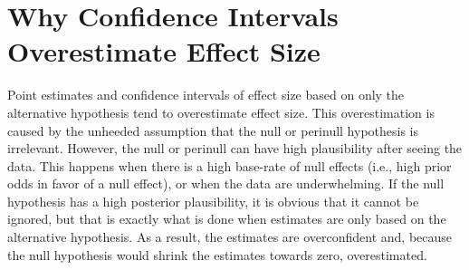 \documentclass[a4paper]{article}
\begin{document}
\section*{Why Confidence Intervals Overestimate Effect Size}
Point estimates and confidence intervals of effect size based on only the alternative hypothesis tend to overestimate effect size. This overestimation is caused by the unheeded assumption that the null or perinull hypothesis is irrelevant. However, the null or perinull can have high plausibility after seeing the data. This happens when there is a high base-rate of null effects (i.e., high prior odds in favor of a null effect), or when the data are underwhelming. If the null hypothesis has a high posterior plausibility, it is obvious that it cannot be ignored, but that is exactly what is done when estimates are only based on the alternative hypothesis. As a result, the estimates are overconfident and, because the null hypothesis would shrink the estimates towards zero, overestimated.

\end{document}
